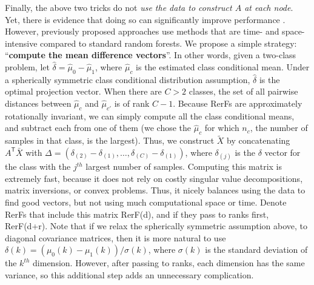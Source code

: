 \documentclass{article} %
\providecommand{\mt}[1]{\widetilde{#1}}
\providecommand{\mh}[1]{\hat{#1}}
\newcommand{\T}{^{\ensuremath{\mathsf{T}}}}           %
\begin{document}
Finally, the above two tricks do not {\em{use the data to construct $A$ at each node}}.  Yet, there is  evidence that doing so can significantly improve performance \cite{Heath1993}.  However, previously proposed approaches use methods that are time- and space-intensive compared to standard random forests.  We propose a simple strategy: ``{\bf{compute the mean difference vectors}}''.  In other words, given a two-class problem, let $\mh{\delta}=\mh{\mu}_0-\mh{\mu}_1$, where $\mh{\mu}_c$ is the estimated class conditional mean.  Under a spherically symmetric class conditional distribution assumption, $\mh{\delta}$ is the optimal projection vector.  When there are $C>2$ classes, the set of all pairwise distances between $\mh{\mu}_c$ and $\mh{\mu}_{c'}$ is of rank $C-1$.  Because RerFs are approximately rotationally invariant, we can simply compute all the class conditional means, and subtract each from one of them (we chose the $\mh{\mu}_c$ for which $n_c$, the number of samples in that class, is the largest). Thus, we construct $\mt{X}$ by concatenating $A\T \bar{X}$ with $\Delta=(\delta_{(2)} - \delta_{(1)}, \ldots, \delta_{(C)} - \delta_{(1)})$, where $\delta_{(j)}$ is the $\delta$ vector for the class with the $j^{th}$ largest number of samples.
Computing this matrix is extremely fast, because it does not rely on costly singular value decompositions, matrix inversions, or convex problems.  Thus, it nicely balances using the data to find good vectors, but not using much computational space or time. Denote RerFs that include this matrix RerF(d), and if they pass to ranks first, RerF(d+r). Note that if we relax the spherically symmetric assumption above, to  diagonal covariance matrices, then it is more natural to use $\delta(k)=(\mu_0(k)-\mu_1(k)) / \sigma(k)$, where $\sigma(k)$ is the standard deviation of the $k^{th}$ dimension.  However, after passing to ranks, each dimension has the same variance, so this additional step adds an unnecessary complication.
\end{document}
